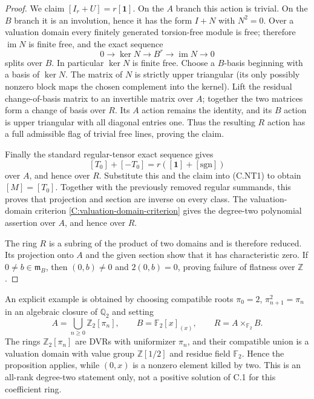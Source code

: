 \begin{proof}
We claim $[I_r+U]=r[\mathbf1]$. On the $A$ branch this action is
trivial. On the $B$ branch it is an involution, hence it has the form
$I+N$ with $N^2=0$. Over a valuation domain every finitely generated
torsion-free module is free; therefore $\operatorname{im}N$ is finite
free, and the exact sequence
\[
       0\longrightarrow\ker N\longrightarrow B^r
          \longrightarrow\operatorname{im}N\longrightarrow0
\]
splits over $B$. In particular $\ker N$ is finite free. Choose a
$B$-basis beginning with a basis of $\ker N$. The matrix of $N$ is
strictly upper triangular (its only possibly nonzero block maps the
chosen complement into the kernel). Lift the residual change-of-basis
matrix to an invertible matrix over $A$; together the two matrices
form a change of basis over $R$. Its $A$ action remains the identity,
and its $B$ action is upper triangular with all diagonal entries one.
Thus the resulting $R$ action has a full admissible flag of trivial
free lines, proving the claim.

Finally the standard regular-tensor exact sequence gives
\[
             [T_0]+[-T_0]=r([\mathbf1]+[\mathrm{sgn}])
\]
over $A$, and hence over $R$. Substitute this and the claim into
(C.NT1) to obtain $[M]=[T_0]$. Together with the previously removed
regular summands, this proves that projection and section are inverse
on every class. The valuation-domain criterion
\ref{C:valuation-domain-criterion} gives the degree-two polynomial
assertion over $A$, and hence over $R$.

The ring $R$ is a subring of the product of two domains and is
therefore reduced. Its projection onto $A$ and the given section
show that it has characteristic zero. If $0\ne b\in\mathfrak m_B$,
then $(0,b)\ne0$ and $2(0,b)=0$, proving failure of flatness over
$\mathbb Z$.
\end{proof}

An explicit example is obtained by choosing compatible roots
$\pi_0=2$, $\pi_{n+1}^2=\pi_n$ in an algebraic closure of $\mathbb Q_2$
and setting
\[
 A=\bigcup_{n\ge0}\mathbb Z_2[\pi_n],\qquad
 B=\mathbb F_2[x]_{(x)},\qquad R=A\times_{\mathbb F_2}B.
\]
The rings $\mathbb Z_2[\pi_n]$ are DVRs with uniformizer $\pi_n$,
and their compatible union is a valuation domain with value group
$\mathbb Z[1/2]$ and residue field $\mathbb F_2$. Hence the proposition
applies, while $(0,x)$ is a nonzero element killed by two. This is an
all-rank degree-two statement only, not a positive solution of C.1
for this coefficient ring.
